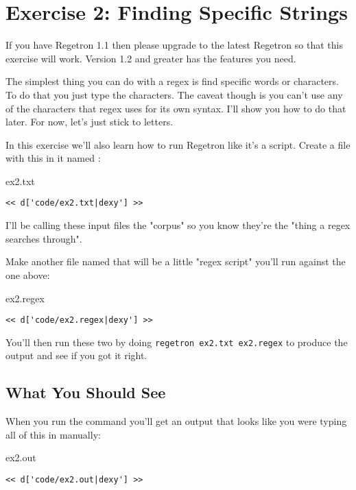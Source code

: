 \chapter{Exercise 2: Finding Specific Strings}

\begin{note}
If you have Regetron 1.1 then please upgrade to the latest Regetron so that
this exercise will work.  Version 1.2 and greater has the features you need.
\end{note}

The simplest thing you can do with a regex is find specific words or characters.
To do that you just type the characters.  The caveat though is you can't use any
of the characters that regex uses for its own syntax.  I'll show you how to do that
later.  For now, let's just stick to letters.

In this exercise we'll also learn how to run Regetron like it's a script.
Create a file with this in it named :

\begin{code}{ex2.txt}
\begin{Verbatim}
<< d['code/ex2.txt|dexy'] >>
\end{Verbatim}
\end{code}

I'll be calling these input files the "corpus" so you know they're the
"thing a regex searches through".

Make another file named  that will be a little
"regex script" you'll run against the one above:

\begin{code}{ex2.regex}
\begin{Verbatim}
<< d['code/ex2.regex|dexy'] >>
\end{Verbatim}
\end{code}

You'll then run these two by doing \verb|regetron ex2.txt ex2.regex| 
to produce the output and see if you got it right.

\section{What You Should See}

When you run the command you'll get an output that looks like you 
were typing all of this in manually:

\begin{code}{ex2.out}
\begin{Verbatim}
<< d['code/ex2.out|dexy'] >>
\end{Verbatim}
\end{code}

